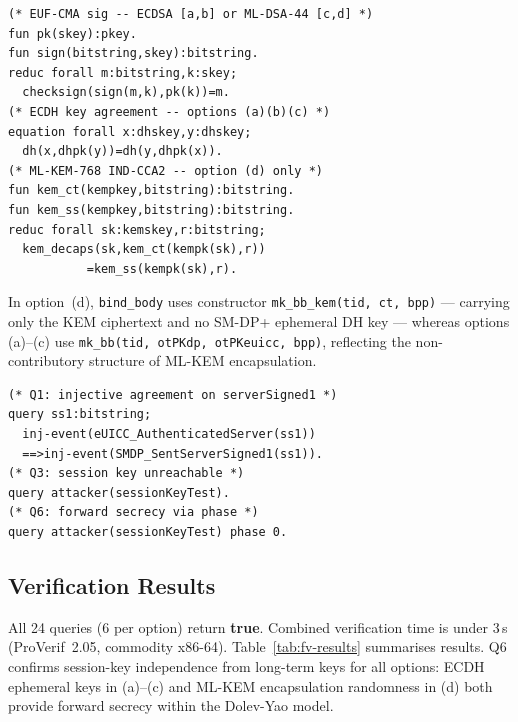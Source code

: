 \documentclass[final,3p,times,twocolumn]{elsarticle}
\begin{document}
\begin{lstlisting}[caption={Cryptographic primitives}]
(* EUF-CMA sig -- ECDSA [a,b] or ML-DSA-44 [c,d] *)
fun pk(skey):pkey.
fun sign(bitstring,skey):bitstring.
reduc forall m:bitstring,k:skey;
  checksign(sign(m,k),pk(k))=m.
(* ECDH key agreement -- options (a)(b)(c) *)
equation forall x:dhskey,y:dhskey;
  dh(x,dhpk(y))=dh(y,dhpk(x)).
(* ML-KEM-768 IND-CCA2 -- option (d) only *)
fun kem_ct(kempkey,bitstring):bitstring.
fun kem_ss(kempkey,bitstring):bitstring.
reduc forall sk:kemskey,r:bitstring;
  kem_decaps(sk,kem_ct(kempk(sk),r))
           =kem_ss(kempk(sk),r).
\end{lstlisting}

In option~(d), \texttt{bind\_body} uses constructor
\texttt{mk\_bb\_kem(tid,\,ct,\,bpp)} --- carrying only the KEM
ciphertext and no SM-DP+ ephemeral DH key --- whereas options (a)--(c)
use \texttt{mk\_bb(tid,\,otPKdp,\,otPKeuicc,\,bpp)}, reflecting the
non-contributory structure of ML-KEM encapsulation.

\begin{lstlisting}[caption={Security queries (representative)}]
(* Q1: injective agreement on serverSigned1 *)
query ss1:bitstring;
  inj-event(eUICC_AuthenticatedServer(ss1))
  ==>inj-event(SMDP_SentServerSigned1(ss1)).
(* Q3: session key unreachable *)
query attacker(sessionKeyTest).
(* Q6: forward secrecy via phase *)
query attacker(sessionKeyTest) phase 0.
\end{lstlisting}

\subsection{Verification Results}\label{sec:fv-results}

All 24 queries (6 per option) return \textbf{true}.  Combined
verification time is under 3\,s (ProVerif~2.05, commodity x86-64).
Table~\ref{tab:fv-results} summarises results.  Q6 confirms
session-key independence from long-term keys for all options: ECDH
ephemeral keys in (a)--(c) and ML-KEM encapsulation randomness in (d)
both provide forward secrecy within the Dolev-Yao model.
\end{document}
